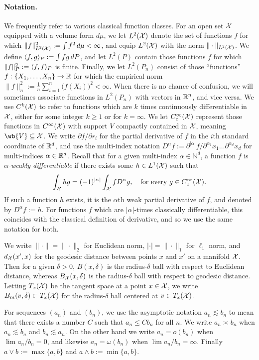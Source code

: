 \paragraph{Notation.}
We frequently refer to various classical function classes. For an open set $\mathcal{X}$ equipped with a volume form $d\mu$, we let $L^2(\mathcal{X})$ denote the set of functions $f$ for which $\|f\|_{L^2(\mathcal{X})}^2 := \int f^2 \,d\mu  < \infty$, and equip $L^2(\mathcal{X})$ with the norm $\|\cdot\|_{L^2(\mathcal{X})}$. We define $\langle f, g \rangle_P := \int fg\,dP$, and let $L^2(P)$ contain those functions $f$ for which $\|f\|_P^2 := \langle f, f \rangle_P$ is finite. Finally, we let $L^2(P_n)$ consist of those ``functions'' $f: \left\{X_1,\ldots,X_n\right\} \to \mathbb{R}$ for which the empirical norm $\|f\|_{n}^2 := \frac{1}{n}\sum_{i = 1}^{n} \bigl(f(X_i)\bigr)^2 < \infty$. When there is no chance of confusion, we will sometimes associate functions in $L^2(P_n)$ with vectors in $\mathbb{R}^n$, and vice versa. We use $C^k(\mathcal{X})$ to refer to functions which are $k$ times continuously differentiable in $\mathcal{X}$, either for some integer $k \geq 1$ or for $k = \infty$. We let $C_c^{\infty}(\mathcal{X})$ represent those functions in $C^{\infty}(\mathcal{X})$ with support $V$ compactly contained in $\mathcal{X}$, meaning $\wb{V} \subseteq \mc{X}$. We write $\partial f/\partial r_i$ for the partial derivative of $f$ in the $i$th standard coordinate of $\mathbb{R}^d$, and use the multi-index notation $D^{\alpha}f := \partial^{|\alpha|}f/\partial^{\alpha_1}x_1\ldots\partial^{\alpha_d}x_d$ for multi-indices $\alpha \in \mathbb{R}^d$. Recall that for a given multi-index $\alpha \in \mathbb{N}^d$, a function $f$ is \emph{$\alpha$-weakly differentiable} if there exists some $h \in L^1(\mathcal{X})$ such that
\begin{equation*}
\int_{\mathcal{X}} h g = (-1)^{|\alpha|} \int_{\mathcal{X}} f D^{\alpha}g, \quad \textrm{for every $g \in C_c^{\infty}(\mathcal{X})$.}
\end{equation*}
If such a function $h$ exists, it is the $\alpha$th weak partial derivative of $f$, and denoted by $D^{\alpha}f := h$. For functions $f$ which are $|\alpha|$-times classically differentiable, this coincides with the classical definition of derivative, and so we use the same notation for both.

We write $\|\cdot\| = \|\cdot\|_2$ for Euclidean norm, $|\cdot| = \|\cdot\|_1$ for $\ell_1$ norm, and $d_{\mathcal{X}}(x',x)$ for the geodesic distance between points $x$ and $x'$ on a manifold $\mathcal{X}$. Then for a given $\delta > 0$, $B(x,\delta)$ is the radius-$\delta$ ball with respect to Euclidean distance, whereas $B_{\mathcal{X}}(x,\delta)$ is the radius-$\delta$ ball with respect to geodesic distance. Letting $T_x(\mathcal{X})$ be the tangent space at a point $x \in \mathcal{X}$, we write $B_m(v,\delta) \subset T_x(\mathcal{X})$ for the radius-$\delta$ ball centered at $v \in T_x(\mathcal{X})$.

For sequences $(a_n)$ and $(b_n)$, we use the asymptotic notation $a_n \lesssim b_n$ to mean that there exists a number $C$ such that $a_n \leq C b_n$ for all $n$. We write $a_n \asymp b_n$ when $a_n \lesssim b_n$ and $b_n \lesssim a_n$. On the other hand we write $a_n = o(b_n)$ when $\lim a_n/b_n = 0$, and likewise $a_n = \omega(b_n)$ when $\lim a_n/b_n = \infty$. Finally $a \vee b := \max\{a,b\}$ and $a \wedge b := \min\{a,b\}$.


